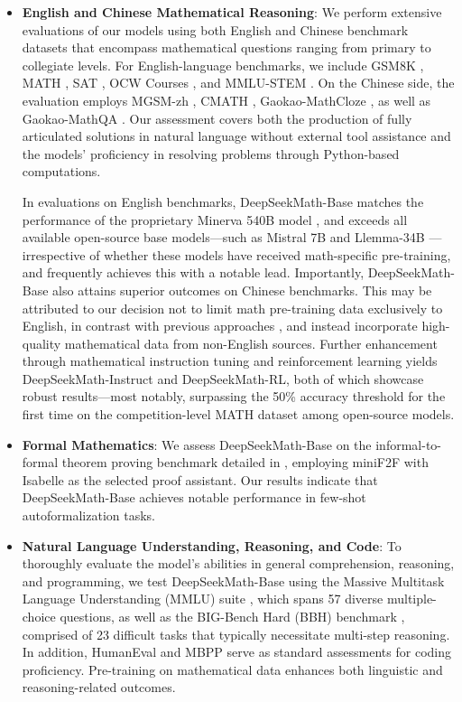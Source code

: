 \begin{itemize}[topsep=0pt]
    \item \textbf{English and Chinese Mathematical Reasoning}: We perform extensive evaluations of our models using both English and Chinese benchmark datasets that encompass mathematical questions ranging from primary to collegiate levels. For English-language benchmarks, we include GSM8K \citep{gsm8k}, MATH \citep{MATH}, SAT \citep{llemma}, OCW Courses \citep{minerva}, and MMLU-STEM \citep{mmlu}. On the Chinese side, the evaluation employs MGSM-zh \citep{mgsm}, CMATH \citep{wei2023cmath}, Gaokao-MathCloze \citep{agieval}, as well as Gaokao-MathQA \citep{agieval}. Our assessment covers both the production of fully articulated solutions in natural language without external tool assistance and the models' proficiency in resolving problems through Python-based computations.

In evaluations on English benchmarks, DeepSeekMath-Base matches the performance of the proprietary Minerva 540B model \citep{minerva}, and exceeds all available open-source base models—such as Mistral 7B \citep{mistral} and Llemma-34B \citep{llemma}—irrespective of whether these models have received math-specific pre-training, and frequently achieves this with a notable lead. Importantly, DeepSeekMath-Base also attains superior outcomes on Chinese benchmarks. This may be attributed to our decision not to limit math pre-training data exclusively to English, in contrast with previous approaches \citep{minerva,llemma}, and instead incorporate high-quality mathematical data from non-English sources. Further enhancement through mathematical instruction tuning and reinforcement learning yields DeepSeekMath-Instruct and DeepSeekMath-RL, both of which showcase robust results—most notably, surpassing the 50\% accuracy threshold for the first time on the competition-level MATH dataset among open-source models.

\item \textbf{Formal Mathematics}: We assess DeepSeekMath-Base on the informal-to-formal theorem proving benchmark detailed in \citep{dsp_proof}, employing miniF2F \citep{minif2f} with Isabelle \citep{isabelle} as the selected proof assistant. Our results indicate that DeepSeekMath-Base achieves notable performance in few-shot autoformalization tasks.

\item \textbf{Natural Language Understanding, Reasoning, and Code}: To thoroughly evaluate the model’s abilities in general comprehension, reasoning, and programming, we test DeepSeekMath-Base using the Massive Multitask Language Understanding (MMLU) suite \citep{mmlu}, which spans 57 diverse multiple-choice questions, as well as the BIG-Bench Hard (BBH) benchmark \citep{bbh}, comprised of 23 difficult tasks that typically necessitate multi-step reasoning. In addition, HumanEval \citep{codex} and MBPP \citep{mbpp} serve as standard assessments for coding proficiency. Pre-training on mathematical data enhances both linguistic and reasoning-related outcomes.


\end{itemize}
